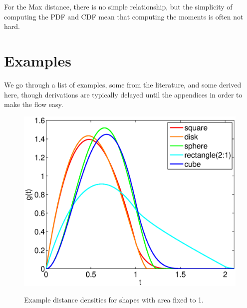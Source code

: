 \documentclass{article}
\begin{document}
For the Max distance, there is no simple relationship, but the
simplicity of computing the PDF and CDF mean that computing the
moments is often not hard.



\section{Examples}
\label{sec:known}

We go through a list of examples, some from the literature, and some
derived here, though derivations are typically delayed until the
appendices in order to make the flow easy.

\begin{figure}[htbp]
  \begin{center}
    \includegraphics[width=0.5\columnwidth]{../Matlab/Plots/LinePicking_plot_fix_area.eps}

    \label{fig:various}
    \caption{Example distance densities for shapes with area fixed to 1.}
  \end{center} 
\vspace{-4mm}
\end{figure}


\clearpage


\clearpage


\clearpage


\clearpage


\clearpage


\clearpage


\clearpage


\clearpage

\clearpage



\clearpage


\clearpage


\clearpage

\end{document}
